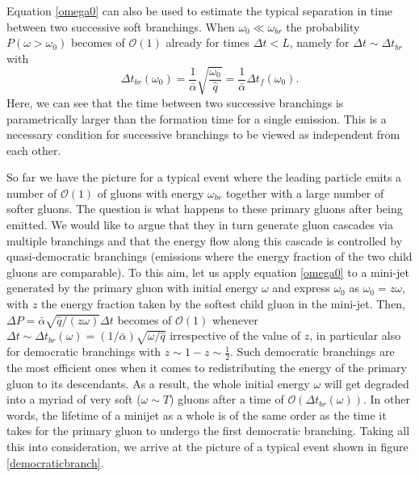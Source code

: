 \documentclass[a4paper,12pt]{article}
\numberwithin{equation}{section}
\begin{document}
Equation \eqref{omega0} can also be used to estimate the typical separation in time between two successive soft branchings. When $\omega_0 \ll \omega_{br}$ the probability $P(\omega>\omega_0)$ becomes of $\mathcal{O}(1)$ already for times $ \Delta t < L$, namely for $\Delta t\sim \Delta t_{br}$ with
\begin{equation}
\Delta t_{br}(\omega_0)=\frac{1}{\bar{\alpha}} \sqrt{\frac{\omega_0}{\hat{q}}} = \frac{1}{\bar{\alpha}} \Delta t_f(\omega_0).
\end{equation}
Here, we can see that the time between two successive branchings is parametrically larger than the formation time for a single emission. This is a necessary condition for successive branchings to be viewed as independent from each other. 

So far we have the picture for a typical event where the leading particle emits a number of $\mathcal{O}(1)$ of gluons with energy $\omega_{br}$ together with a large number of softer gluons. The question is what happens to these primary gluons after being emitted. We would like to argue that they in turn generate gluon cascades via multiple branchings and that the energy flow along this cascade is controlled by quasi-democratic branchings (emissions where the energy fraction of the two child gluons are comparable)\cite{Blaizot:2013hx}.  To this aim, let us apply equation \eqref{omega0} to a mini-jet generated by the primary gluon with initial energy $\omega$ and express $\omega_0$ as $\omega_0=z\omega$, with $z$ the energy fraction taken by the softest child gluon in the mini-jet. Then, $\Delta P = \bar{\alpha} \sqrt{{\hat{q}}/{(z \omega)}}\Delta t$ becomes of $\mathcal{O}(1)$ whenever $\Delta t \sim \Delta t_{br}(\omega)=({1}/{\bar{\alpha}}) \sqrt{{\omega}/{\hat{q}}}$ irrespective of the value of $z$, in particular also for democratic branchings with $z \sim 1-z \sim \frac{1}{2}$. Such democratic branchings are the most efficient ones when it comes to redistributing the energy of the primary gluon to its descendants. As a result, the whole initial energy $\omega$ will get degraded into a myriad of very soft ($\omega \sim T$) gluons after a time of $\mathcal{O}(\Delta t_{br}(\omega))$. In other words, the lifetime of a minijet as a whole is of the same order as the time it takes for the primary gluon to undergo the first democratic branching.
Taking all this into consideration, we arrive at the picture of a typical event shown in figure \ref{democraticbranch}.
\end{document}
